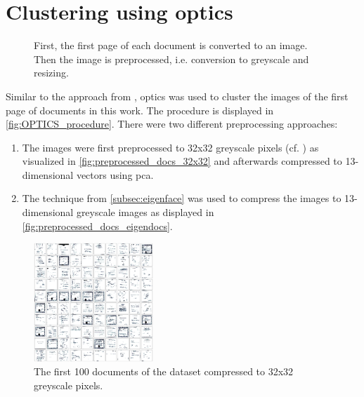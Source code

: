 \section{Clustering using \acs*{optics}}\label{sec:impl-optics}

\begin{figure}[htp] %
    \centering
    
    \caption{First, the first page of each document is converted to an image.
    Then the image is preprocessed, i.e. conversion to greyscale and resizing.
    }
    \label{fig:OPTICS_procedure}
\end{figure}

Similar to the approach from \cite{OPTICS1999}, \ac{optics} was used to cluster the images of the first page of documents in this work.
The procedure is displayed in \autoref{fig:OPTICS_procedure}.
There were two different preprocessing approaches:
\begin{enumerate}
    \item \label{pt:32}The images were first preprocessed to 32x32 greyscale pixels (cf. \cite{OPTICS1999}) as visualized in \autoref{fig:preprocessed_docs_32x32}
    and afterwards compressed to 13-dimensional vectors using \ac{pca}.
    \item \label{pt:eigendocs}The technique \eigendocs{} from \autoref{subsec:eigenface} 
    was used to compress the images to 13-dimensional greyscale images as displayed in \autoref{fig:preprocessed_docs_eigendocs}.
\end{enumerate}


\begin{figure}[htp] %
    \centering
    \includegraphics[width=0.4\textwidth]{images/OPTICS/32x32/preprocessed_docs.pdf}
    \caption{The first 100 documents of the dataset compressed to 32x32 greyscale pixels.
    }
    \label{fig:preprocessed_docs_32x32}
\end{figure}

